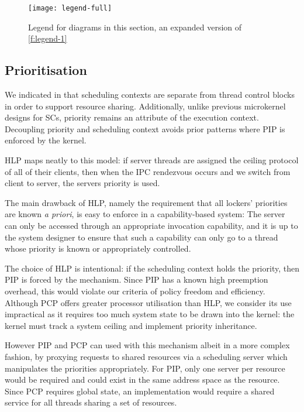 \begin{figure}
    \centering
    \texttt{[image: legend-full]}
    \caption{Legend for diagrams in this section, an expanded version of \cref{f:legend-1}}
    \label{f:legend-2}
\end{figure}

\subsection{Prioritisation}

We indicated in  that scheduling contexts are separate from thread control blocks in
order to support resource sharing. Additionally, unlike previous microkernel designs for \glspl{SC}, priority
remains an attribute of the execution context. Decoupling priority and scheduling context avoids
prior patterns where \gls{PIP} is enforced by the kernel. 

\gls{HLP} maps neatly to this model: if server threads are assigned the ceiling protocol of all of
their clients, then when the \gls{IPC} rendezvous occurs and we switch from client to server, the
servers priority is used.

The main drawback of \gls{HLP}, namely the requirement that all
lockers' priorities are known \emph{a priori}, is easy to enforce in a
capability-based system: The server can only be accessed through an
appropriate invocation capability, and it is up to the system designer
to ensure that such a capability can only go to a thread whose
priority is known or appropriately controlled.

The choice of \gls{HLP} is intentional: if the scheduling context holds the priority, then \gls{PIP}
is forced by the mechanism. Since \gls{PIP} has a known high preemption overhead, this would violate
our criteria of policy freedom and efficiency.  
Although \gls{PCP} offers greater processor utilisation than \gls{HLP}, we consider its use impractical as it requires too much system state to be drawn into the kernel: the kernel must track a system ceiling and implement priority inheritance.

However \gls{PIP} and \gls{PCP} can used with this mechanism albeit in a more complex fashion, by
proxying requests to shared resources via a scheduling server which manipulates the priorities
appropriately. For \gls{PIP}, only one server per resource would be required and could exist in the
same address space as the resource. Since \gls{PCP} requires global state, an implementation would
require a shared service for all threads sharing a set of resources.

